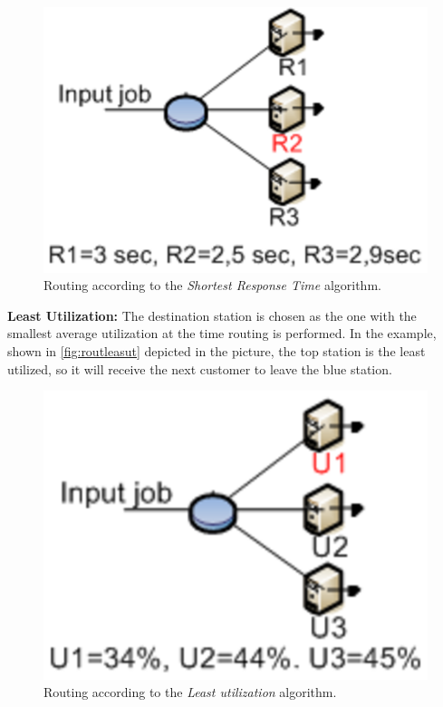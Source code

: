 \begin{itemize*}
\begin{figure}[htb]
    \begin{center}
        \includegraphics[scale=.5]{img/jsimg/8.12.eps}
    \end{center}
    \caption{Routing according to the \emph{Shortest Response Time} algorithm.}
    \label{fig:routstrespt}
\end{figure}

\item \textbf{Least Utilization:} The destination station is
chosen as the one with the smallest average utilization at the
time routing is performed. In the example, shown in
\autoref{fig:routleasut} depicted in the picture, the top station
is the least utilized, so it will receive the next customer to
leave the blue station.
\begin{figure}[htb]
    \begin{center}
        \includegraphics[scale=.5]{img/jsimg/8.13.eps}
    \end{center}
    \caption{Routing according to the \emph{Least utilization} algorithm.}
    \label{fig:routleasut}
\end{figure}


\end{itemize*}
